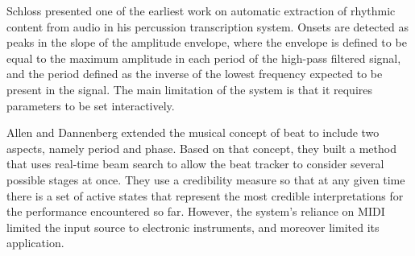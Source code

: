 \documentclass{scrartcl}
\begin{document}



Schloss \cite{Schloss1985} presented one of the earliest work on automatic extraction of rhythmic content from audio in his percussion transcription system. Onsets are detected as peaks in the slope of the amplitude envelope, where the envelope is defined to be equal to the maximum amplitude in each period of the high-pass filtered signal, and the period defined as the inverse of the lowest frequency expected to be present in the signal. The main limitation of the system is that it requires parameters to be set interactively. 

Allen and Dannenberg \cite{Allen1990} extended the musical concept of beat to include two aspects, namely period and phase. Based on that concept, they built a method that uses real-time beam search to allow the beat tracker to consider several possible stages at once. They use a credibility measure so that at any given time there is a set of active states that represent the most credible interpretations for the performance encountered so far. However, the system's reliance on MIDI limited the input source to electronic instruments, and moreover limited its application.
\end{document}
